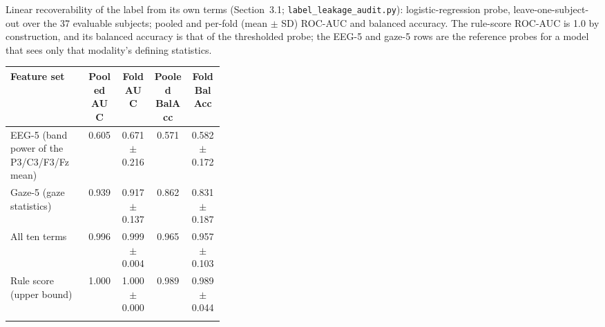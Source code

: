 \documentclass[pdflatex,sn-basic,Numbered]{sn-jnl}
\makeatletter
\newenvironment{suptable}{\par\bigskip\noindent\begin{minipage}{\textwidth}\def\@captype{table}\centering\tablebodyfont}{\end{minipage}\par\bigskip}
\makeatother
\begin{document}
\begin{suptable}
\caption{Linear recoverability of the label from its own terms (Section~3.1; \texttt{label\_leakage\_audit.py}): logistic-regression probe, leave-one-subject-out over the 37 evaluable subjects; pooled and per-fold (mean $\pm$ SD) ROC-AUC and balanced accuracy. The rule-score ROC-AUC is 1.0 by construction, and its balanced accuracy is that of the thresholded probe; the EEG-5 and gaze-5 rows are the reference probes for a model that sees only that modality's defining statistics.}\label{tabS15}
\footnotesize
\setlength{\tabcolsep}{3pt}\begin{tabular*}{\linewidth}{@{\extracolsep{\fill}}p{0.36\linewidth}cccc@{}}
\toprule
Feature set & Pooled AUC & Fold AUC & Pooled BalAcc & Fold BalAcc \\
\midrule
EEG-5 (band power of the P3/C3/F3/Fz mean) & 0.605 & 0.671 $\pm$ 0.216 & 0.571 & 0.582 $\pm$ 0.172 \\
Gaze-5 (gaze statistics) & 0.939 & 0.917 $\pm$ 0.137 & 0.862 & 0.831 $\pm$ 0.187 \\
All ten terms & 0.996 & 0.999 $\pm$ 0.004 & 0.965 & 0.957 $\pm$ 0.103 \\
Rule score (upper bound) & 1.000 & 1.000 $\pm$ 0.000 & 0.989 & 0.989 $\pm$ 0.044 \\
\botrule
\end{tabular*}
\end{suptable}
\end{document}
